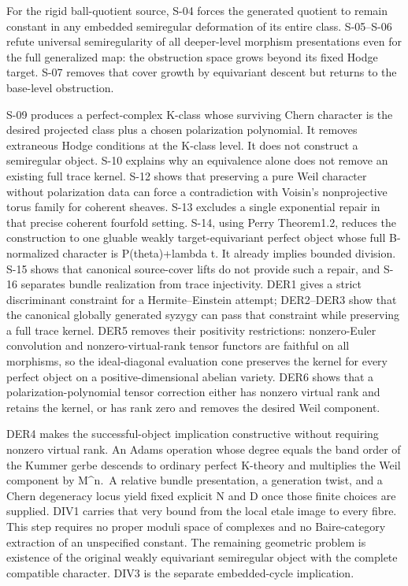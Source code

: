 \documentclass[11pt,a4paper]{article}
\theoremstyle{definition}
\begin{document}
For the rigid ball-quotient source, S-04 forces the generated quotient
to remain constant in any embedded semiregular deformation of its entire
class. S-05--S-06 refute universal semiregularity of all deeper-level
morphism presentations even for the full generalized map: the
obstruction space grows beyond its fixed Hodge target. S-07 removes that
cover growth by equivariant descent but returns to the base-level
obstruction.

S-09 produces a perfect-complex K-class whose surviving Chern character
is the desired projected class plus a chosen polarization polynomial. It
removes extraneous Hodge conditions at the K-class level. It does not
construct a semiregular object. S-10 explains why an equivalence alone
does not remove an existing full trace kernel. S-12 shows that
preserving a pure Weil character without polarization data can force a
contradiction with Voisin's nonprojective torus family for coherent
sheaves. S-13 excludes a single exponential repair in that precise
coherent fourfold setting. S-14, using Perry Theorem1.2, reduces the
construction to one gluable weakly target-equivariant perfect object
whose full B-normalized character is P(theta)+lambda t. It already
implies bounded division. S-15 shows that canonical source-cover lifts
do not provide such a repair, and S-16 separates bundle realization from
trace injectivity. DER1 gives a strict discriminant constraint for a
Hermite--Einstein attempt; DER2--DER3 show that the canonical globally
generated syzygy can pass that constraint while preserving a full trace
kernel. DER5 removes their positivity restrictions: nonzero-Euler
convolution and nonzero-virtual-rank tensor functors are faithful on all
morphisms, so the ideal-diagonal evaluation cone preserves the kernel
for every perfect object on a positive-dimensional abelian variety. DER6
shows that a polarization-polynomial tensor correction either has
nonzero virtual rank and retains the kernel, or has rank zero and
removes the desired Weil component.

DER4 makes the successful-object implication constructive without
requiring nonzero virtual rank. An Adams operation whose degree equals
the band order of the Kummer gerbe descends to ordinary perfect K-theory
and multiplies the Weil component by M\^{}n.~A relative bundle
presentation, a generation twist, and a Chern degeneracy locus yield
fixed explicit N and D once those finite choices are supplied. DIV1
carries that very bound from the local etale image to every fibre. This
step requires no proper moduli space of complexes and no Baire-category
extraction of an unspecified constant. The remaining geometric problem
is existence of the original weakly equivariant semiregular object with
the complete compatible character. DIV3 is the separate embedded-cycle
implication.
\end{document}
